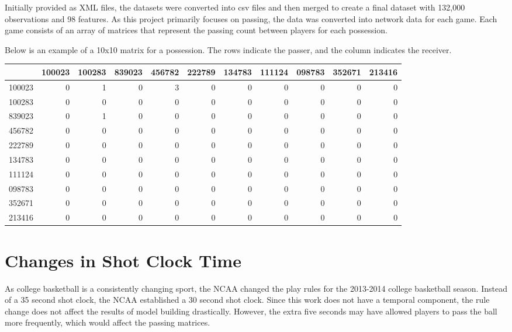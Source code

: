 \documentclass[12pt,twoside]{dukestatscithesis}
\theoremstyle{definition}
\theoremstyle{definition}
\theoremstyle{definition}
\theoremstyle{remark}
\begin{document}
Initially provided as XML files, the datasets were converted into csv
files and then merged to create a final dataset with 132,000
observations and 98 features. As this project primarily focuses on
passing, the data was converted into network data for each game. Each
game consists of an array of matrices that represent the passing count
between players for each possession.

Below is an example of a 10x10 matrix for a possession. The rows
indicate the passer, and the column indicates the receiver.
\begin{table}[H]
\centering
\begin{tabular}{l|r|r|r|r|r|r|r|r|r|r}
\hline
  & 100023 & 100283 & 839023 & 456782 & 222789 & 134783 & 111124 & 098783 & 352671 & 213416\\
\hline
100023 & 0 & 1 & 0 & 3 & 0 & 0 & 0 & 0 & 0 & 0\\
\hline
100283 & 0 & 0 & 0 & 0 & 0 & 0 & 0 & 0 & 0 & 0\\
\hline
839023 & 0 & 1 & 0 & 0 & 0 & 0 & 0 & 0 & 0 & 0\\
\hline
456782 & 0 & 0 & 0 & 0 & 0 & 0 & 0 & 0 & 0 & 0\\
\hline
222789 & 0 & 0 & 0 & 0 & 0 & 0 & 0 & 0 & 0 & 0\\
\hline
134783 & 0 & 0 & 0 & 0 & 0 & 0 & 0 & 0 & 0 & 0\\
\hline
111124 & 0 & 0 & 0 & 0 & 0 & 0 & 0 & 0 & 0 & 0\\
\hline
098783 & 0 & 0 & 0 & 0 & 0 & 0 & 0 & 0 & 0 & 0\\
\hline
352671 & 0 & 0 & 0 & 0 & 0 & 0 & 0 & 0 & 0 & 0\\
\hline
213416 & 0 & 0 & 0 & 0 & 0 & 0 & 0 & 0 & 0 & 0\\
\hline
\end{tabular}
\end{table}
\section{Changes in Shot Clock Time}\label{changes-in-shot-clock-time}

As college basketball is a consistently changing sport, the NCAA changed
the play rules for the 2013-2014 college basketball season. Instead of a
35 second shot clock, the NCAA established a 30 second shot clock. Since
this work does not have a temporal component, the rule change does not
affect the results of model building drastically. However, the extra
five seconds may have allowed players to pass the ball more frequently,
which would affect the passing matrices.
\end{document}

